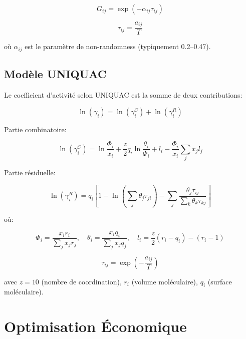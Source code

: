 \documentclass[11pt,a4paper]{article}
\begin{document}
\begin{equation}
G_{ij} = \exp(-\alpha_{ij} \tau_{ij})
\end{equation}

\begin{equation}
\tau_{ij} = \frac{a_{ij}}{T}
\end{equation}

où $\alpha_{ij}$ est le paramètre de non-randomness (typiquement 0.2--0.47).

\subsection{Modèle UNIQUAC}

Le coefficient d'activité selon UNIQUAC est la somme de deux contributions:

\begin{equation}
\ln(\gamma_i) = \ln(\gamma_i^C) + \ln(\gamma_i^R)
\end{equation}

Partie combinatoire:

\begin{equation}
\ln(\gamma_i^C) = \ln\frac{\Phi_i}{x_i} + \frac{z}{2}q_i\ln\frac{\theta_i}{\Phi_i} + l_i - \frac{\Phi_i}{x_i}\sum_j x_j l_j
\end{equation}

Partie résiduelle:

\begin{equation}
\ln(\gamma_i^R) = q_i\left[1 - \ln\left(\sum_j \theta_j \tau_{ji}\right) - \sum_j \frac{\theta_j \tau_{ij}}{\sum_k \theta_k \tau_{kj}}\right]
\end{equation}

où:

\begin{equation}
\Phi_i = \frac{x_i r_i}{\sum_j x_j r_j}, \quad \theta_i = \frac{x_i q_i}{\sum_j x_j q_j}, \quad l_i = \frac{z}{2}(r_i - q_i) - (r_i - 1)
\end{equation}

\begin{equation}
\tau_{ij} = \exp\left(-\frac{a_{ij}}{T}\right)
\end{equation}

avec $z=10$ (nombre de coordination), $r_i$ (volume moléculaire), $q_i$ (surface moléculaire).

\section{Optimisation Économique}
\end{document}

